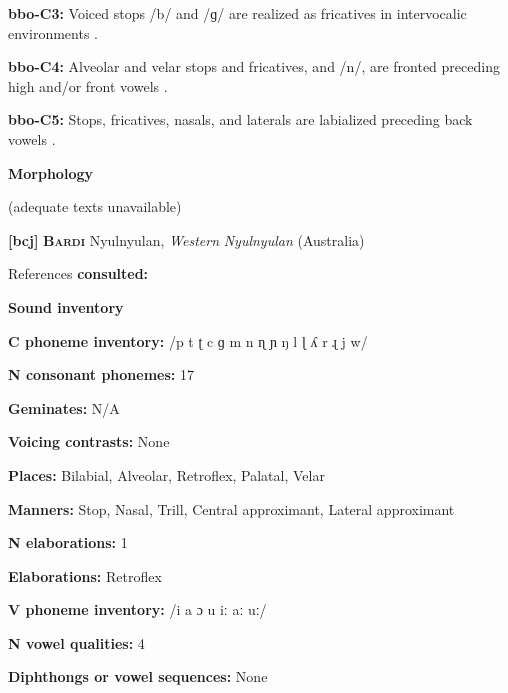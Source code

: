 \textbf{bbo-C3:} Voiced stops /b/ and /ɡ/ are realized as fricatives in intervocalic environments \citep[22]{Morse1976}.



\textbf{bbo-C4:} Alveolar and velar stops and fricatives, and /n/, are fronted preceding high and/or front vowels \citep[20-23]{Morse1976}.



\textbf{bbo-C5:} Stops, fricatives, nasals, and laterals are labialized preceding back vowels \citep[20]{Morse1976}.



\textbf{Morphology}



(adequate texts unavailable)



\textbf{[bcj]}   \textbf{\textsc{Bardi}  }  Nyulnyulan, \textit{Western} \textit{Nyulnyulan} (Australia)



References \textbf{consulted:} \citet{Bowern2012}



\textbf{Sound inventory}



\textbf{C phoneme inventory:} /p t ʈ c ɡ m n ɳ ɲ ŋ l ɭ ʎ r ɻ j w/



\textbf{N consonant phonemes:} 17



\textbf{Geminates:} N/A



\textbf{Voicing contrasts:} None



\textbf{Places:} Bilabial, Alveolar, Retroflex, Palatal, Velar



\textbf{Manners:} Stop, Nasal, Trill, Central approximant, Lateral approximant



\textbf{N elaborations:} 1



\textbf{Elaborations:} Retroflex



\textbf{V phoneme inventory:} /i a ɔ u iː aː uː/



\textbf{N vowel qualities:} 4



\textbf{Diphthongs or vowel sequences:} None



